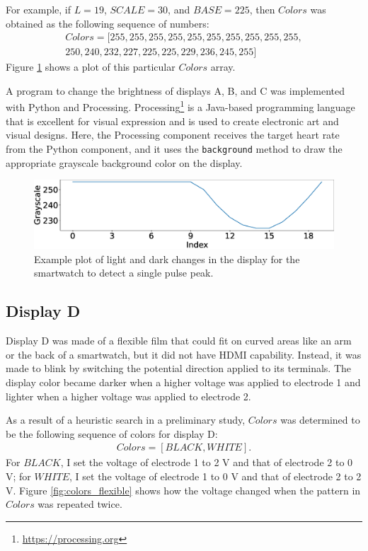 For example, if $L=19$, $SCALE=30$, and $BASE=225$, then $Colors$ was obtained as the following sequence of numbers:
\begin{equation*}
  \begin{split}
    Colors = [255, 255, 255, 255, 255, 255, 255, 255, 255, 255,\\250, 240, 232, 227, 225, 225, 229, 236, 245, 255]
  \end{split}
\end{equation*}
Figure \ref{fig:colors_wave} shows a plot of this particular $Colors$ array.\par

A program to change the brightness of displays A, B, and C was implemented with Python and Processing. Processing\footnote{\url{https://processing.org}} is a Java-based programming language that is excellent for visual expression and is used to create electronic art and visual designs. Here, the Processing component receives the target heart rate from the Python component, and it uses the \texttt{background} method to draw the appropriate grayscale background color on the display.

\begin{figure}[!t]
  \centering
  \includegraphics[width=1\linewidth]{figures/colors_wave.eps}
  \caption{Example plot of light and dark changes in the display for the smartwatch to detect a single pulse peak.}
  \label{fig:colors_wave}
\end{figure}

\subsection{Display D}
Display D was made of a flexible film that could fit on curved areas like an arm or the back of a smartwatch, but it did not have HDMI capability. Instead, it was made to blink by switching the potential direction applied to its terminals. The display color became darker when a higher voltage was applied to electrode 1 and lighter when a higher voltage was applied to electrode 2.\par

As a result of a heuristic search in a preliminary study, $Colors$ was determined to be the following sequence of colors for display D:
\begin{equation*}
  \begin{split}
    Colors = [BLACK, WHITE].
  \end{split}
\end{equation*}
For $BLACK$, I set the voltage of electrode 1 to 2 V and that of electrode 2 to 0 V; for $WHITE$, I set the voltage of electrode 1 to 0 V and that of electrode 2 to 2 V. Figure \ref{fig:colors_flexible} shows how the voltage changed when the pattern in $Colors$ was repeated twice.\par

